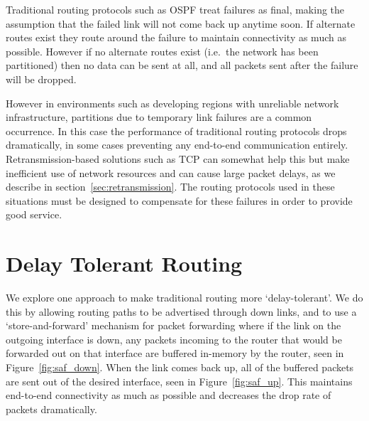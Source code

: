 \documentclass[withindex,glossary,openany]{cam-thesis}
\begin{document}
Traditional routing protocols such as OSPF treat failures as final, making the assumption that the failed link will not come back up anytime soon. If alternate routes exist they route around the failure to maintain connectivity as much as possible. However if no alternate routes exist (i.e.\ the network has been partitioned) then no data can be sent at all, and all packets sent after the failure will be dropped.

However in environments such as developing regions with unreliable network infrastructure, partitions due to temporary link failures are a common occurrence. In this case the performance of traditional routing protocols drops dramatically, in some cases preventing any end-to-end communication entirely. Retransmission-based solutions such as TCP can somewhat help this but make inefficient use of network resources and can cause large packet delays, as we describe in section~\ref{sec:retransmission}. The routing protocols used in these situations must be designed to compensate for these failures in order to provide good service.

\section{Delay Tolerant Routing}

We explore one approach to make traditional routing more `delay-tolerant'. We do this by allowing routing paths to be advertised through down links, and to use a `store-and-forward' mechanism \cite{SAF} for packet forwarding where if the link on the outgoing interface is down, any packets incoming to the router that would be forwarded out on that interface are buffered in-memory by the router, seen in Figure~\ref{fig:saf_down}. When the link comes back up, all of the buffered packets are sent out of the desired interface, seen in Figure~\ref{fig:saf_up}. This maintains end-to-end connectivity as much as possible and decreases the drop rate of packets dramatically.
\end{document}
